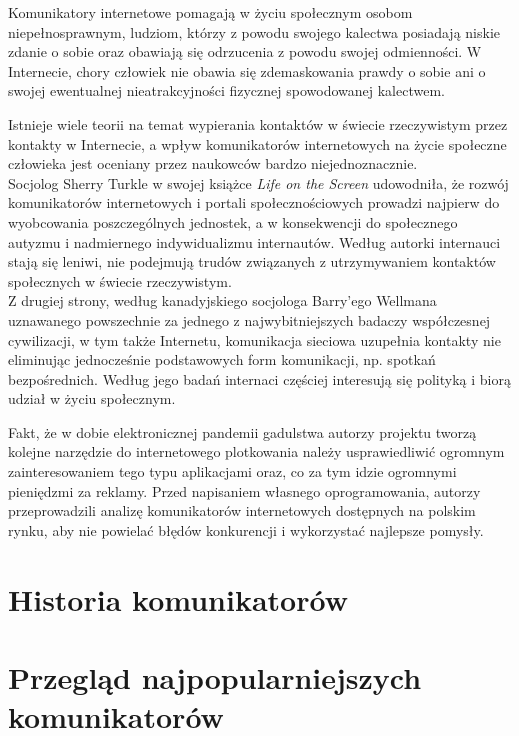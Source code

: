 \documentclass[a4paper,12pt]{article}
\begin{document}
\par Komunikatory internetowe pomagają w życiu społecznym osobom niepełnosprawnym, ludziom, którzy z powodu swojego kalectwa posiadają niskie zdanie o sobie oraz obawiają się odrzucenia z powodu swojej odmienności. W Internecie, chory człowiek nie obawia się zdemaskowania prawdy o sobie ani o swojej ewentualnej nieatrakcyjności fizycznej spowodowanej kalectwem.

\par Istnieje wiele teorii na temat wypierania kontaktów w świecie rzeczywistym przez kontakty w Internecie, a wpływ komunikatorów internetowych na życie społeczne człowieka jest oceniany przez naukowców bardzo niejednoznacznie.\\
Socjolog Sherry Turkle w swojej książce \emph{Life on the Screen} udowodniła, że rozwój komunikatorów internetowych i portali społecznościowych prowadzi najpierw do wyobcowania poszczególnych jednostek, a w konsekwencji do społecznego autyzmu i nadmiernego indywidualizmu internautów.
Według autorki internauci stają się leniwi, nie podejmują trudów związanych z utrzymywaniem kontaktów społecznych w świecie rzeczywistym.\\
Z drugiej strony, według kanadyjskiego socjologa Barry'ego Wellmana uznawanego powszechnie za jednego z najwybitniejszych badaczy współczesnej cywilizacji, w tym także Internetu, komunikacja sieciowa uzupełnia kontakty nie eliminując jednocześnie podstawowych form komunikacji, np. spotkań bezpośrednich. Według jego badań internaci częściej interesują się polityką i biorą udział w życiu społecznym.

\par Fakt, że w dobie elektronicznej pandemii gadulstwa autorzy projektu tworzą kolejne narzędzie do internetowego plotkowania należy usprawiedliwić ogromnym zainteresowaniem tego typu aplikacjami oraz, co za tym idzie ogromnymi pieniędzmi za reklamy. Przed napisaniem własnego oprogramowania, autorzy przeprowadzili analizę komunikatorów internetowych dostępnych na polskim rynku, aby nie powielać błędów konkurencji i wykorzystać najlepsze pomysły.

\section[Historia komunikatorów]{Historia komunikatorów}
\section[Przegląd najpopularniejszych komunikatorów]{Przegląd najpopularniejszych komunikatorów}
\end{document}
